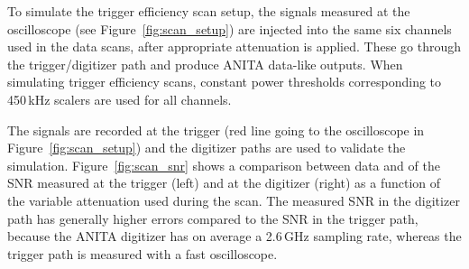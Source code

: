 
To simulate the trigger efficiency scan setup, the signals
measured at the oscilloscope (see Figure~\ref{fig:scan_setup}) are
injected into the same six channels used in the data scans, after
appropriate attenuation is applied.
These go through the trigger/digitizer path and produce ANITA
data-like outputs.
When simulating trigger efficiency scans, constant power
thresholds corresponding to 450\,kHz scalers are used for all channels.

The signals are recorded at the trigger (red line going to the
oscilloscope in Figure~\ref{fig:scan_setup}) and the digitizer paths
are used to validate the simulation.
Figure~\ref{fig:scan_snr} shows a comparison between data and \icemc
of the SNR measured at the trigger (left)
and at the digitizer (right) as a function of the variable attenuation used
during the scan.
The measured SNR in the digitizer path has generally higher errors compared to the SNR in the trigger path, because the ANITA digitizer has on average a
2.6\,GHz sampling rate, whereas the trigger path is measured with a
fast oscilloscope. 

